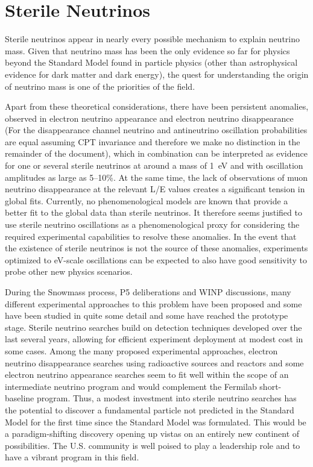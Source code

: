 \section{Sterile Neutrinos}
\label{sec:Sterile}

Sterile neutrinos appear in nearly every possible mechanism to explain
neutrino mass. Given that neutrino mass has been the only evidence so
far for physics beyond the Standard Model found in particle physics
(other than astrophysical evidence for dark matter and dark
energy), the quest for understanding the origin of neutrino mass is
one of the priorities of the field.

Apart from these theoretical considerations, there have been
persistent anomalies, observed in electron neutrino appearance and
electron neutrino disappearance (For the disappearance channel
neutrino and antineutrino oscillation probabilities are equal assuming
CPT invariance and therefore we make no distinction in the remainder of
the document), which in combination can be interpreted as evidence
for one or several sterile neutrinos at around a mass of 1~eV and with
oscillation amplitudes as large as 5--10\%. At the same time, the lack
of observations of muon neutrino disappearance at the relevant L/E
values creates a significant tension in global fits. Currently, no
phenomenological models are known that provide a better fit to the
global data than sterile neutrinos. It therefore seems justified to
use sterile neutrino oscillations as a phenomenological proxy for
considering the required experimental capabilities to resolve these
anomalies. In the event that the existence of sterile neutrinos is not
the source of these anomalies, experiments optimized to eV-scale
oscillations can be expected to also have good sensitivity to probe
other new physics scenarios.

During the Snowmass process, P5 deliberations and WINP discussions,
many different experimental approaches to this problem have been
proposed and some have been studied in quite some detail and some have
reached the prototype stage. Sterile neutrino searches build on
detection techniques developed over the last several years, allowing
for efficient experiment deployment at modest cost in some cases.
Among the many proposed experimental approaches, electron neutrino
disappearance searches using radioactive sources and reactors and some
electron neutrino appearance searches seem to fit well within the
scope of an intermediate neutrino program and would complement the
Fermilab short-baseline program. Thus, a modest investment into
sterile neutrino searches has the potential to discover a fundamental 
particle not
predicted in the Standard Model for the first time since the Standard
Model was formulated. This would be a paradigm-shifting discovery
opening up vistas on an entirely new continent of possibilities. The
U.S. community is well poised to play a leadership role and to have a
vibrant program in this field.

